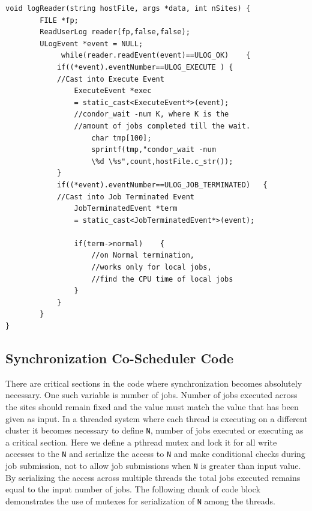 \documentclass[ms,electronic,double]{nuthesis}
\begin{document}
\begin{lstlisting}
void logReader(string hostFile, args *data, int nSites)	{		
		FILE *fp;
		ReadUserLog reader(fp,false,false);
		ULogEvent *event = NULL;		
             while(reader.readEvent(event)==ULOG_OK)	{                    
            if((*event).eventNumber==ULOG_EXECUTE )	{                                
            //Cast into Execute Event
                ExecuteEvent *exec 
                = static_cast<ExecuteEvent*>(event);                                       
                //condor_wait -num K, where K is the 
                //amount of jobs completed till the wait.
                    char tmp[100];
                    sprintf(tmp,"condor_wait -num 
                    \%d \%s",count,hostFile.c_str());
            }            
            if((*event).eventNumber==ULOG_JOB_TERMINATED)	{                
            //Cast into Job Terminated Event
                JobTerminatedEvent *term 
                = static_cast<JobTerminatedEvent*>(event);                
                
                if(term->normal)	{                    
                    //on Normal termination, 
                    //works only for local jobs, 
                    //find the CPU time of local jobs
                }               
            }
        }
}

\end{lstlisting}
\subsection{Synchronization Co-Scheduler Code}

There are critical sections in the code where synchronization becomes absolutely 
necessary. One such variable is number of jobs. Number of jobs executed across 
the sites should remain fixed and the value must match the value that has been 
given as input. In a threaded system where each thread is executing on a 
different cluster it becomes necessary to define \texttt{N}, number of jobs executed or executing as a 
critical section. Here we define a pthread mutex and lock it for all write accesses to the \texttt{N}
and serialize the access to \texttt{N} and make conditional checks during job submission, not to allow
job submissions when \texttt{N} is greater than input value. By 
serializing the access across multiple threads the total jobs executed remains 
equal to the input number of jobs. The following chunk of code block 
demonstrates the use of mutexes for serialization of  \texttt{N} among the threads.
\end{document}
